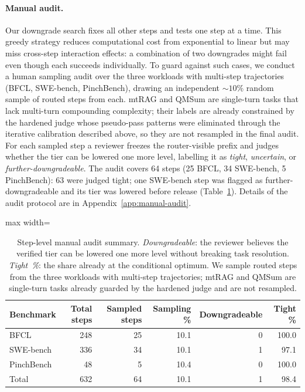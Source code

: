 \paragraph{Manual audit.}
Our downgrade search fixes all other steps and tests one step at a time. This
greedy strategy reduces computational cost from exponential to linear but may
miss cross-step interaction effects: a combination of two downgrades might fail
even though each succeeds individually. To guard against such cases, we conduct
a human sampling audit over the three workloads with multi-step trajectories
(BFCL, SWE-bench, PinchBench), drawing an independent ${\sim}10\%$ random
sample of routed steps from each. mtRAG and QMSum are single-turn tasks that
lack multi-turn compounding complexity; their labels are already constrained by
the hardened judge whose pseudo-pass patterns were eliminated through the
iterative calibration described above, so they are not resampled in the final
audit. For each sampled step a reviewer freezes the router-visible prefix
and judges whether the tier can be lowered one more level, labelling it as
\emph{tight}, \emph{uncertain}, or \emph{further-downgradeable}. The audit
covers 64 steps (25 BFCL, 34 SWE-bench, 5 PinchBench): 63 were judged tight;
one SWE-bench step was flagged as further-downgradeable and its tier was lowered
before release (Table~\ref{tab:manual-audit-main}). Details of the audit
protocol are in Appendix~\ref{app:manual-audit}.

\begin{table}[t]
\centering
\small
\begin{adjustbox}{max width=\linewidth}
\begin{tabular}{lrrrrr}
\toprule
Benchmark & Total steps & Sampled steps & Sampling \% & Downgradeable & Tight \% \\
\midrule
BFCL & 248 & 25 & 10.1 & 0 & 100.0 \\
SWE-bench & 336 & 34 & 10.1 & 1 & 97.1 \\
PinchBench & 48 & 5 & 10.4 & 0 & 100.0 \\
\midrule
Total & 632 & 64 & 10.1 & 1 & 98.4 \\
\bottomrule
\end{tabular}
\end{adjustbox}
\caption{Step-level manual audit summary. \emph{Downgradeable}: the reviewer
believes the verified tier can be lowered one more level without breaking task
resolution. \emph{Tight~\%}: the share already at the conditional optimum.
We sample routed steps from the three workloads with multi-step trajectories;
mtRAG and QMSum are single-turn tasks already guarded by the hardened judge and
are not resampled.}
\label{tab:manual-audit-main}
\end{table}


